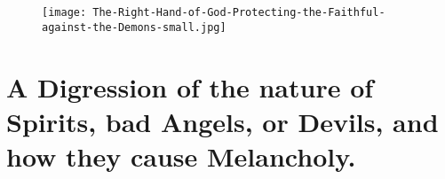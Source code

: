 {{\cleartoleftpage{}
\begin{figure}[p!]
  \begingroup
  \centering
  \texttt{[image: The-Right-Hand-of-God-Protecting-the-Faithful-against-the-Demons-small.jpg]}
  \label{fig:therighthandofgod}
\end{figure}

\clearpage{}
\thispagestyle{titleontop}

\section[Nature of bad Angels, or Devils]{A Digression of the nature of Spirits, bad Angels, or Devils, and how they cause Melancholy.}

}}
